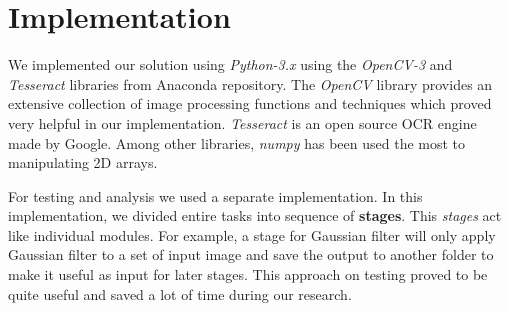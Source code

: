 \documentclass{standalone}
\begin{document}
\section{Implementation}
We implemented our solution using {\it Python-3.x} using the {\it OpenCV-3} and {\it Tesseract} libraries from Anaconda repository. 
The {\it OpenCV} library provides an extensive collection of image processing functions and techniques which proved very helpful in our implementation. 
{\it Tesseract} is an open source OCR engine made by Google.
Among other libraries, {\it numpy} has been used the most to manipulating 2D arrays.

For testing and analysis we used a separate implementation. In this implementation, we divided entire tasks into sequence of {\bf stages}. This {\it stages} act like individual modules. For example, a stage for Gaussian filter will only apply Gaussian filter to a set of input image and save the output to another folder to make it useful as input for later stages. This approach on testing proved to be quite useful and saved a lot of time during our research.
\end{document}
